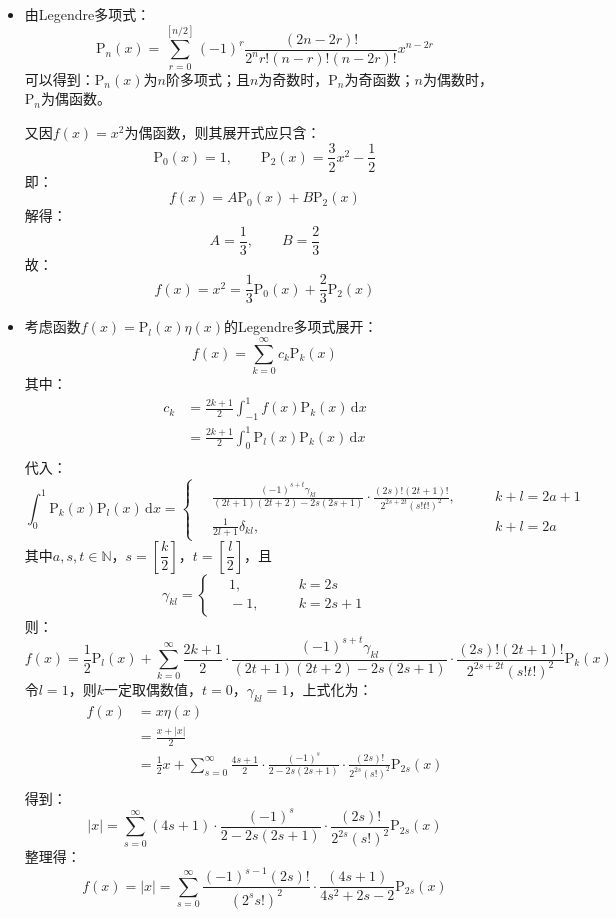 \documentclass[fontset=windows]{ctexart}
\begin{document}
\begin{itemize}
    \item[4.(1)]
    由Legendre多项式：
    \[
    \mathrm{P}_n(x) = \sum_{r=0}^{[n/2]}(-1)^r\frac{(2n-2r)!}{2^n r!(n-r)!(n-2r)!}x^{n-2r}
    \]
    可以得到：$\mathrm{P}_n(x)$为$n$阶多项式；且$n$为奇数时，$\mathrm{P}_n$为奇函数；$n$为偶数时，$\mathrm{P}_n$为偶函数。

    又因$f(x)=x^2$为偶函数，则其展开式应只含：
    \[
    \mathrm{P}_0(x) = 1,\qquad \mathrm{P}_2(x) = \frac{3}{2}x^2 - \frac{1}{2}
    \]
    即：
    \[
    f(x) = A\mathrm{P}_0(x) + B\mathrm{P}_2(x)
    \]
    解得：
    \[
    A = \frac{1}{3},\qquad B = \frac{2}{3}
    \]
    故：
    \[
    f(x) = x^2 = \frac{1}{3}\mathrm{P}_0(x) + \frac{2}{3}\mathrm{P}_2(x)
    \]
    \bigskip

    \item[4.(3)]
    考虑函数$f(x)=\mathrm{P}_l(x)\eta(x)$的Legendre多项式展开：
    \[
    f(x) = \sum_{k=0}^{\infty}c_k\mathrm{P}_k(x)
    \]
    其中：
    \begin{align*}
    c_k
    &= \frac{2k+1}{2}\int_{-1}^{1}f(x)\mathrm{P}_k(x)\,\mathrm{d}x \\
    &= \frac{2k+1}{2}\int_{0}^{1}\mathrm{P}_l(x)\mathrm{P}_k(x)\,\mathrm{d}x \\
    \end{align*}
    代入：
    \[
    \int_{0}^{1}\mathrm{P}_k(x)\mathrm{P}_l(x)\,\mathrm{d}x =
    \left\{
    \begin{aligned}
        &\ \frac{(-1)^{s+t}\gamma_{kl}}{(2t+1)(2t+2)-2s(2s+1)}\cdot\frac{(2s)!(2t+1)!}{2^{2s+2t} (s!t!)^2},\qquad &k+l=2a+1 \\
        &\ \frac{1}{2l+1}\delta_{kl},\qquad &k+l=2a
    \end{aligned}
    \right.
    \]
    其中$a,s,t\in\mathbb{N}$，$s=\left[\dfrac{k}{2}\right]$，$t=\left[\dfrac{l}{2}\right]$，且
    \[
    \gamma_{kl} =
    \left\{
    \begin{aligned}
        &\ 1,\qquad &k=2s \\
        &\ -1,\qquad &k=2s+1
    \end{aligned}
    \right.
    \]
    则：
    \[
    f(x) = \frac{1}{2}\mathrm{P}_l(x) + \sum_{k=0}^{\infty}\frac{2k
        +1}{2}\cdot\frac{(-1)^{s+t}\gamma_{kl}}{(2t+1)(2t+2)-2s(2s+1)}\cdot\frac{(2s)!(2t+1)!}{2^{2s+2t} (s!t!)^2}\mathrm{P}_k(x)
    \]
    令$l=1$，则$k$一定取偶数值，$t=0$，$\gamma_{kl}=1$，上式化为：
    \begin{align*}
        f(x)
        &= x\eta(x) \\
        &= \frac{x+|x|}{2} \\
        &= \frac{1}{2}x + \sum_{s=0}^{\infty}\frac{4s+1}{2}\cdot\frac{(-1)^{s}}{2-2s(2s+1)}\cdot\frac{(2s)!}{2^{2s} (s!)^2}\mathrm{P}_{2s}(x) \\
    \end{align*}
    得到：
    \[
    |x| = \sum_{s=0}^{\infty}(4s+1)\cdot\frac{(-1)^{s}}{2-2s(2s+1)}\cdot\frac{(2s)!}{2^{2s} (s!)^2}\mathrm{P}_{2s}(x)
    \]
    整理得：
    \[
    f(x) = |x| = \sum_{s=0}^{\infty}\frac{(-1)^{s-1}(2s)!}{\left(2^{s} s!\right)^2}\cdot\frac{(4s+1)}{4s^2+2s-2}\mathrm{P}_{2s}(x)
    \]
    \bigskip


\end{itemize}
\end{document}

